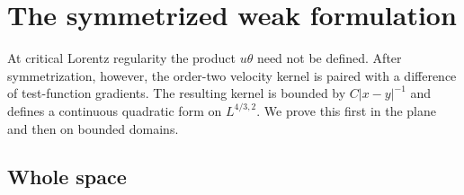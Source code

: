 \documentclass[11pt,reqno]{amsproc}
\begin{document}
\section{The symmetrized weak formulation}\label{sec:symmetrized}

At critical Lorentz regularity the product $u\theta$ need not be defined.
After symmetrization, however, the order-two velocity kernel is paired with a
difference of test-function gradients.  The resulting kernel is bounded by
$C|x-y|^{-1}$ and defines a continuous quadratic form on $L^{4/3,2}$.  We
prove this first in the plane and then on bounded domains.

\subsection{Whole space}
\end{document}
